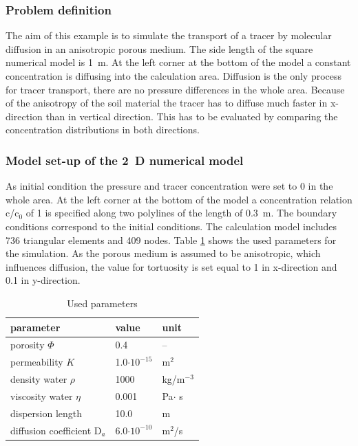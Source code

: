 
\subsubsection*{Problem definition}

The aim of this example is to simulate the transport of a tracer by molecular diffusion in an anisotropic porous medium. The side length of the square numerical model is 1~m. At the left corner at the bottom of the model a constant concentration is diffusing into the calculation area. Diffusion is the only process for tracer transport, there are no pressure differences in the whole area. Because of the anisotropy of the soil material the tracer has to diffuse much faster in x-direction than in vertical direction. This has to be evaluated by comparing the concentration distributions in both directions.

\subsubsection*{Model set-up of the 2~D numerical model}

As initial condition the pressure and tracer concentration were set to 0 in the whole area. At the left corner at the bottom of the model a concentration relation c/c$_0$ of 1 is specified along two polylines of the length of 0.3~m. The boundary conditions correspond to the initial conditions. The calculation model includes 736 triangular elements and 409 nodes. Table \ref{tab55} shows the used parameters for the simulation. As the porous medium is assumed to be anisotropic, which influences diffusion, the value for tortuosity is set equal to 1 in x-direction and 0.1 in y-direction.

\begin{table}[htbp]
\centering
\begin{tabular}{|l|l|l|}
\hline
parameter & value & unit \\
\hline
porosity $\Phi$ & 0.4 & -- \\
\hline
permeability $K$ & 1.0$\cdot 10^{-15}$ & m$^2$ \\
\hline
density water $\rho$  & 1000 & kg/m$^{-3}$  \\		
\hline	
viscosity water $\eta$ & 0.001 & Pa$\cdot$ s \\
\hline	
dispersion length & 10.0 & m \\
\hline
diffusion coefficient D$_a$ & 6.0$\cdot 10^{-10}$ & m$^2$/s  \\
\hline
\end{tabular}
\caption{Used parameters}
\label{tab55}
\end{table}

